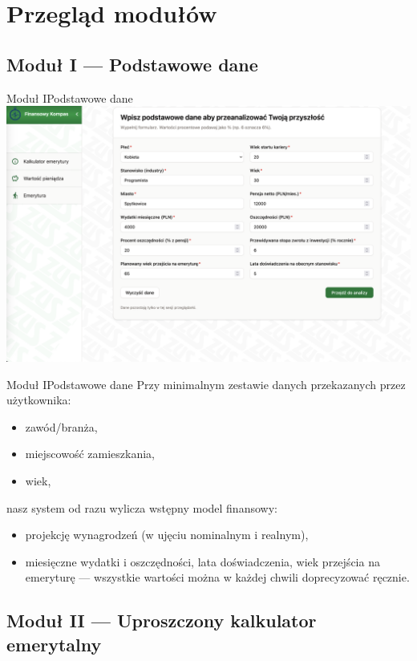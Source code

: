 \section{Przegląd modułów}

\subsection{Moduł I --- Podstawowe dane}

\begin{frame}[t]{Moduł I}{Podstawowe dane}
  \includegraphics[width=.8\textwidth]{img/module_1_basic_data}
\end{frame}

\begin{frame}[t]{Moduł I}{Podstawowe dane}
Przy minimalnym zestawie danych przekazanych przez użytkownika:
\pause
\begin{itemize}
  \item zawód/branża,
  \pause
  \item miejscowość zamieszkania,
  \pause
  \item wiek,
\end{itemize}
\pause
nasz system od razu wylicza wstępny model finansowy:
\begin{itemize}
  \pause
  \item projekcję wynagrodzeń (w ujęciu nominalnym i realnym),
  \pause
  \item miesięczne wydatki i oszczędności, lata doświadczenia, wiek przejścia na emeryturę —
        wszystkie wartości można w każdej chwili doprecyzować ręcznie.
\end{itemize}
\end{frame}

\subsection{Moduł II --- Uproszczony kalkulator emerytalny}


